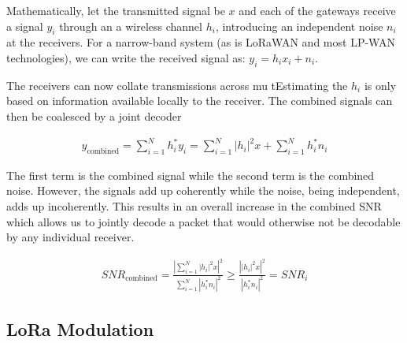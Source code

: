 Mathematically, let the transmitted signal be $x$ and each of the gateways receive a signal $y_i$ through an a wireless channel $h_i$, introducing an independent noise $n_i$ at the receivers. For a narrow-band system (as is LoRaWAN and most LP-WAN technologies), we can write the received signal as: $y_i = h_i x_i + n_i $. 




The receivers can now collate transmissions across mu tEstimating the $h_i$ is only based on information available locally to the
receiver. The combined signals can then be coalesced by a joint decoder

\begin{align*}
y_{\text{combined}}
	= \sum_{i=1}^N h^*_i y_i
	= \sum_{i=1}^N \left| h_i \right|^2 x + \sum_{i=1}^N h^*_i n_i
\end{align*}

The first term is the combined signal while the second term is the combined
noise. However, the signals add up coherently while the noise, being
independent, adds up incoherently.  This results in an overall increase in the
combined SNR which allows us to jointly decode a packet that would otherwise
not be decodable by any individual receiver.

\begin{align*}
SNR_{\text{combined}} %
	= \frac{\left| \sum_{i=1}^N \left| h_i \right|^2 x \right|^2}{\sum_{i=1}^N \left| h^*_i n_i \right|^2} 
	\geq \frac{\left| \left| h_i \right|^2 x \right|^2}{\left| h^*_i n_i \right|^2} = SNR_i
\end{align*}

\subsection{LoRa Modulation}
\label{sec:lora}

